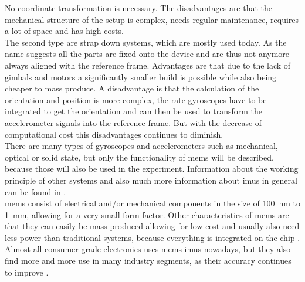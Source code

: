 No coordinate transformation is necessary.
The disadvantages are that the mechanical structure of the setup is complex, needs regular maintenance, requires a lot of space and has high costs.\\
The second type are strap down systems, which are mostly used today.
As the name suggests all the parts are fixed onto the device and are thus not anymore always aligned with the reference frame.
Advantages are that due to the lack of gimbals and motors a significantly smaller build is possible while also being cheaper to mass produce.
A disadvantage is that the calculation of the orientation and position is more complex, the rate gyroscopes have to be integrated to get the orientation and can then be used to transform the accelerometer signals into the reference frame.
But with the decrease of computational cost this disadvantages continues to diminish.\\
There are many types of gyroscopes and accelerometers such as mechanical, optical or solid state, but only the functionality of \gls{mems} will be described, because those will also be used in the experiment.
Information about the working principle of other systems and also much more information about \gls{imu}s in general can be found in \cite{Woodman2007}.\\
\gls{mems} consist of electrical and/or mechanical components in the size of \SI{100}{\nano\metre} to \SI{1}{\milli\metre}, allowing for a very small form factor.
Other characteristics of \gls{mems} are that they can easily be mass-produced allowing for low cost and usually also need less power than traditional systems, because everything is integrated on the chip \cite{Shaeffer2013}.
Almost all consumer grade electronics uses \gls{mems}-\gls{imu}s nowadays, but they also find more and more use in many industry segments, as their accuracy continues to improve \cite{Perlmutter2016}.

